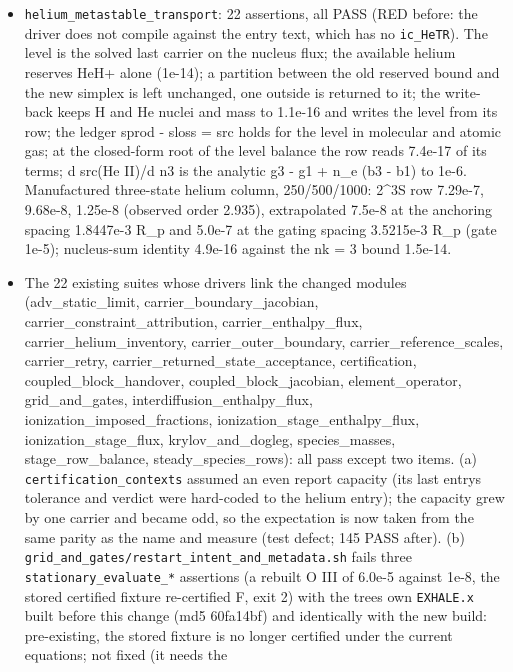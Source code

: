 \documentclass[english,a4paper]{my_memo}
\providecommand{\tightlist}{\setlength{\itemsep}{0pt}\setlength{\parskip}{0pt}}
\begin{document}
\begin{itemize}
\tightlist
\item
  \texttt{helium\_metastable\_transport}: 22 assertions, all PASS (RED before: the
  driver does not compile against the entry text, which has no
  \texttt{ic\_HeTR}). The level is the solved last carrier on the nucleus flux; the
  available helium reserves HeH+ alone (1e-14); a partition between the old
  reserved bound and the new simplex is left unchanged, one outside is
  returned to it; the write-back keeps H and He nuclei and mass to 1.1e-16
  and writes the level from its row; the ledger sprod - sloss = src holds
  for the level in molecular and atomic gas; at the closed-form root of the
  level balance the row reads 7.4e-17 of its terms; d src(He II)/d n3 is
  the analytic g3 - g1 + n\_e (b3 - b1) to 1e-6. Manufactured three-state
  helium column, 250/500/1000: 2\^{}3S row 7.29e-7, 9.68e-8, 1.25e-8 (observed
  order 2.935), extrapolated 7.5e-8 at the anchoring spacing 1.8447e-3 R\_p
  and 5.0e-7 at the gating spacing 3.5215e-3 R\_p (gate 1e-5); nucleus-sum
  identity 4.9e-16 against the nk = 3 bound 1.5e-14.
\item
  The 22 existing suites whose drivers link the changed modules
  (adv\_static\_limit, carrier\_boundary\_jacobian,
  carrier\_constraint\_attribution, carrier\_enthalpy\_flux,
  carrier\_helium\_inventory, carrier\_outer\_boundary,
  carrier\_reference\_scales, carrier\_retry,
  carrier\_returned\_state\_acceptance, certification,
  coupled\_block\_handover, coupled\_block\_jacobian, element\_operator,
  grid\_and\_gates, interdiffusion\_enthalpy\_flux,
  ionization\_imposed\_fractions, ionization\_stage\_enthalpy\_flux,
  ionization\_stage\_flux, krylov\_and\_dogleg, species\_masses,
  stage\_row\_balance, steady\_species\_rows): all pass except two items.
  (a) \texttt{certification\_contexts} assumed an even report capacity (its last
  entry\textquotesingle s tolerance and verdict were hard-coded to the helium entry); the
  capacity grew by one carrier and became odd, so the expectation is now
  taken from the same parity as the name and measure (test defect; 145
  PASS after). (b) \texttt{grid\_and\_gates/restart\_intent\_and\_metadata.sh} fails
  three \texttt{stationary\_evaluate\_*} assertions (a rebuilt O III of 6.0e-5
  against 1e-8, the stored certified fixture re-certified F, exit 2) with
  the tree\textquotesingle s own \texttt{EXHALE.x} built before this change (md5 60fa14bf) and
  identically with the new build: pre-existing, the stored fixture is no
  longer certified under the current equations; not fixed (it needs the

\end{itemize}
\end{document}
